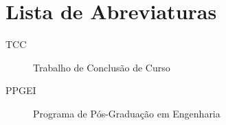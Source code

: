 \newpage
\section*{\centering Lista de Abreviaturas}

\begin{description}
    \item[TCC] Trabalho de Conclusão de Curso
    \item[PPGEI] Programa de Pós-Graduação em Engenharia
\end{description}
